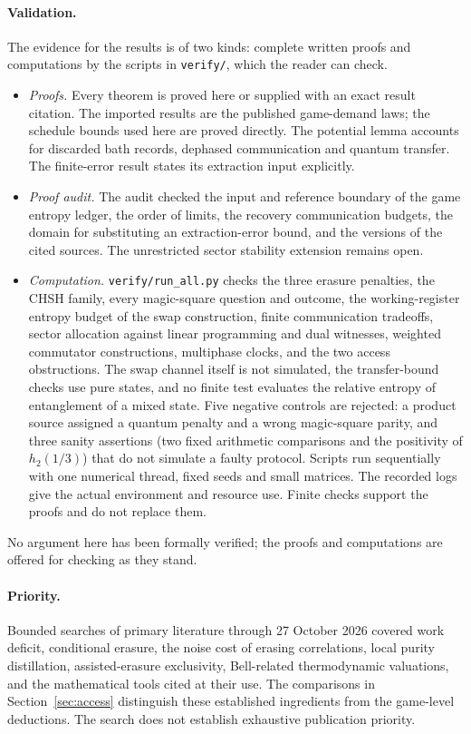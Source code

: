 \paragraph{Validation.} The evidence for the results is of two kinds: complete written proofs and computations by the scripts in
\texttt{verify/}, which the reader can check.
\begin{itemize}[leftmargin=*,itemsep=2pt]
\item \emph{Proofs.} Every theorem is proved here or supplied with an exact result citation. The imported results are the published game-demand laws; the schedule bounds used here are proved directly. The potential lemma accounts for discarded bath records, dephased communication and quantum transfer. The finite-error result states its extraction input explicitly.
\item \emph{Proof audit.} The audit checked the input and reference boundary of the game entropy ledger, the order of limits, the recovery communication budgets, the domain for substituting an extraction-error bound, and the versions of the cited sources. The unrestricted sector stability extension remains open.
\item \emph{Computation.} \texttt{verify/run\_all.py} checks the three erasure penalties, the CHSH family, every magic-square question and outcome, the working-register entropy budget of the swap construction, finite communication tradeoffs, sector allocation against linear programming and dual witnesses, weighted commutator constructions, multiphase clocks, and the two access obstructions. The swap channel itself is not simulated, the transfer-bound checks use pure states, and no finite test evaluates the relative entropy of entanglement of a mixed state. Five negative controls are rejected: a product source assigned a quantum penalty and a wrong magic-square parity, and three sanity assertions (two fixed arithmetic comparisons and the positivity of $h_2(1/3)$) that do not simulate a faulty protocol. Scripts run sequentially with one numerical thread, fixed seeds and small matrices. The recorded logs give the actual environment and resource use. Finite checks support the proofs and do not replace them.
\end{itemize}
No argument here has been formally verified; the proofs and computations are offered for checking as they stand.

\paragraph{Priority.} Bounded searches of primary literature through 27 October 2026 covered work deficit, conditional erasure, the noise cost of erasing correlations, local purity distillation, assisted-erasure exclusivity, Bell-related thermodynamic valuations, and the mathematical tools cited at their use. The comparisons in Section~\ref{sec:access} distinguish these established ingredients from the game-level deductions. The search does not establish exhaustive publication priority.

